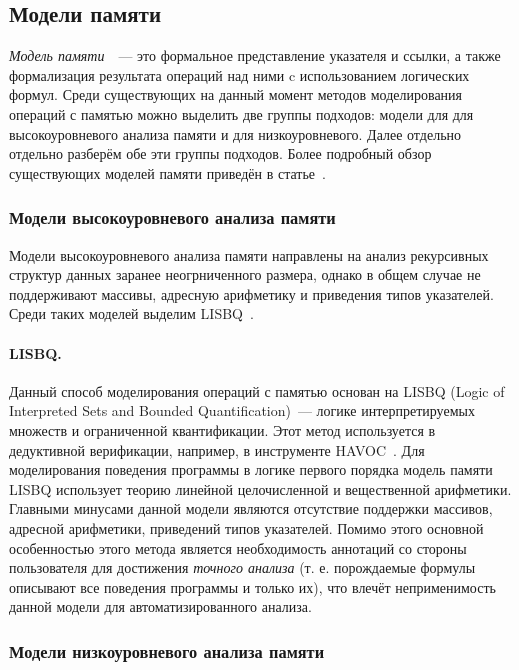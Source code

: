 
\subsection{Модели памяти}
\emph{Модель памяти}~\cite{mandrik}~--- это формальное представление указателя и ссылки, а также формализация результата операций над ними c использованием логических формул. Среди существующих на данный момент методов моделирования операций с памятью можно выделить две группы подходов: модели для для высокоуровневого анализа памяти и для низкоуровневого. Далее отдельно отдельно разберём обе эти группы подходов. Более подробный обзор существующих моделей памяти приведён в статье~\cite{mandrik}.

\subsubsection{Модели высокоуровневого анализа памяти}

Модели высокоуровневого анализа памяти направлены на анализ рекурсивных структур данных заранее неогрниченного размера, однако в общем случае не поддерживают массивы, адресную арифметику и приведения типов указателей. Среди таких моделей выделим \textsc{LISBQ}~\cite{lahiri2008back}.

\paragraph{LISBQ.} Данный способ моделирования операций с памятью основан на LISBQ (Logic of Interpreted Sets and Bounded Quantification)~--- логике интерпретируемых множеств и ограниченной квантификации. Этот метод используется в дедуктивной верификации, например, в инструменте \textsc{HAVOC}~\cite{bornat2000proving}. Для моделирования поведения программы в логике первого порядка модель памяти LISBQ использует теорию линейной целочисленной и вещественной арифметики. Главными минусами данной модели являются отсутствие поддержки массивов, адресной арифметики, приведений типов указателей. Помимо этого основной особенностью этого метода является необходимость аннотаций со стороны пользователя для достижения \emph{точного анализа} (т. е. порождаемые формулы описывают все поведения программы и только их), что влечёт неприменимость данной модели для автоматизированного анализа.

\subsubsection{Модели низкоуровневого анализа памяти}

